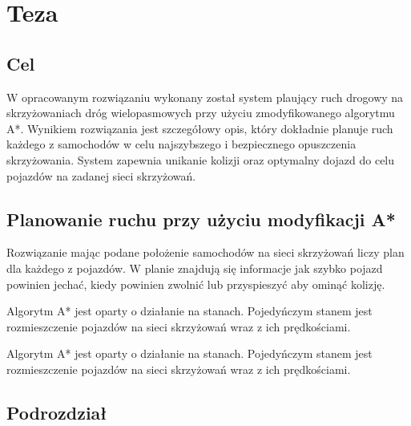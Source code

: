 \chapter{Teza} \label{chap:thesis}

\section{Cel}

W opracowanym rozwiązaniu wykonany został system plaujący ruch drogowy na skrzyżowaniach dróg wielopasmowych przy użyciu zmodyfikowanego algorytmu A*.
\newline
\newline
Wynikiem rozwiązania jest szczegółowy opis, który dokładnie planuje ruch każdego z samochodów w celu najszybszego i bezpiecznego opuszczenia skrzyżowania.
\newline
\newline
System zapewnia unikanie kolizji oraz optymalny dojazd do celu pojazdów na zadanej sieci skrzyżowań.

\section{Planowanie ruchu przy użyciu modyfikacji A*}

\newline
\newline
Rozwiązanie mając podane położenie samochodów na sieci skrzyżowań liczy plan dla każdego z pojazdów. W planie znajdują się informacje jak szybko pojazd powinien jechać, kiedy powinien zwolnić lub przyspieszyć aby ominąć kolizję.

\newline
\newline
Algorytm A* jest oparty o działanie na stanach. Pojedyńczym stanem jest rozmieszczenie pojazdów na sieci skrzyżowań wraz z ich prędkościami.

\newline
\newline
Algorytm A* jest oparty o działanie na stanach. Pojedyńczym stanem jest rozmieszczenie pojazdów na sieci skrzyżowań wraz z ich prędkościami.
\section{Podrozdział}

\bt 
